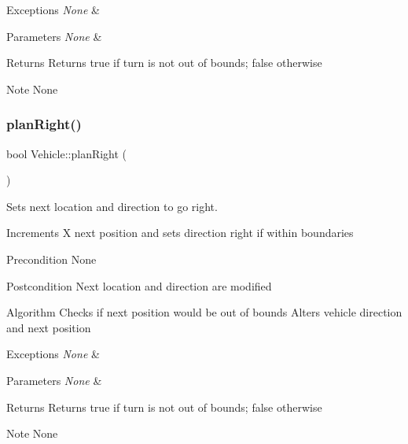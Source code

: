 \begin{DoxyExceptions}{Exceptions}
{\em None} & \\
\hline
\end{DoxyExceptions}

\begin{DoxyParams}{Parameters}
{\em None} & \\
\hline
\end{DoxyParams}
\begin{DoxyReturn}{Returns}
Returns true if turn is not out of bounds; false otherwise
\end{DoxyReturn}
\begin{DoxyNote}{Note}
None 
\end{DoxyNote}
\hypertarget{class_vehicle_ac2202fc51fc16e2e8c5edd4222368d3d}{}\label{class_vehicle_ac2202fc51fc16e2e8c5edd4222368d3d} 
\subsubsection{\texorpdfstring{plan\+Right()}{planRight()}}
{\footnotesize\ttfamily bool Vehicle\+::plan\+Right (\begin{DoxyParamCaption}{ }\end{DoxyParamCaption})\hspace{0.3cm}{\ttfamily [protected]}}



Sets next location and direction to go right. 

Increments X next position and sets direction right if within boundaries

\begin{DoxyPrecond}{Precondition}
None
\end{DoxyPrecond}
\begin{DoxyPostcond}{Postcondition}
Next location and direction are modified
\end{DoxyPostcond}
\begin{DoxyParagraph}{Algorithm}
Checks if next position would be out of bounds Alters vehicle direction and next position
\end{DoxyParagraph}

\begin{DoxyExceptions}{Exceptions}
{\em None} & \\
\hline
\end{DoxyExceptions}

\begin{DoxyParams}{Parameters}
{\em None} & \\
\hline
\end{DoxyParams}
\begin{DoxyReturn}{Returns}
Returns true if turn is not out of bounds; false otherwise
\end{DoxyReturn}
\begin{DoxyNote}{Note}
None 
\end{DoxyNote}
\hypertarget{class_vehicle_ac89c292d9ac2c1f2183d068e8fa6d9be}{}\label{class_vehicle_ac89c292d9ac2c1f2183d068e8fa6d9be} 
